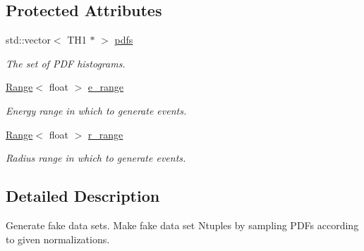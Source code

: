 \subsection*{Protected Attributes}
\begin{DoxyCompactItemize}
\item 
\hypertarget{classFakeDataGenerator_a5b49313ba3ec9b9a7030187164f530b6}{
std::vector$<$ TH1 $\ast$ $>$ \hyperlink{classFakeDataGenerator_a5b49313ba3ec9b9a7030187164f530b6}{pdfs}}
\label{classFakeDataGenerator_a5b49313ba3ec9b9a7030187164f530b6}

\begin{DoxyCompactList}\small\item\em The set of PDF histograms. \item\end{DoxyCompactList}\item 
\hypertarget{classFakeDataGenerator_a2f71f284630d70c4219b2bc5d006be4a}{
\hyperlink{structRange}{Range}$<$ float $>$ \hyperlink{classFakeDataGenerator_a2f71f284630d70c4219b2bc5d006be4a}{e\_\-range}}
\label{classFakeDataGenerator_a2f71f284630d70c4219b2bc5d006be4a}

\begin{DoxyCompactList}\small\item\em Energy range in which to generate events. \item\end{DoxyCompactList}\item 
\hypertarget{classFakeDataGenerator_a161a9652d5be58423cd13c6985d56a2d}{
\hyperlink{structRange}{Range}$<$ float $>$ \hyperlink{classFakeDataGenerator_a161a9652d5be58423cd13c6985d56a2d}{r\_\-range}}
\label{classFakeDataGenerator_a161a9652d5be58423cd13c6985d56a2d}

\begin{DoxyCompactList}\small\item\em Radius range in which to generate events. \item\end{DoxyCompactList}\end{DoxyCompactItemize}


\subsection{Detailed Description}
Generate fake data sets. Make fake data set Ntuples by sampling PDFs according to given normalizations. 

